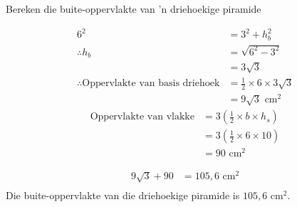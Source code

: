 \begin{wex}{Bereken die buite-oppervlakte van 'n driehoekige piramide}
{\begin{align*}

6^2 &= 3^2+h_b^2\\
\therefore h_b&=\sqrt{6^2-3^2}\\
&=3\sqrt{3}\\
\therefore \mbox{Oppervlakte van basis driehoek} &= \frac{1}{2} \times 6 \times 3\sqrt{3}\\
&=9\sqrt{3}\mbox{ cm}^2
\end{align*}
\begin{align*}
 \mbox{Oppervlakte van vlakke} &= 3\left(\frac{1}{2} \times b\times h_s\right)\\
&=3\left(\frac{1}{2} \times 6 \times 10\right)\\
&=90\mbox{ cm}^2
\end{align*}

\begin{align*}
9\sqrt{3} + 90&=105,6\mbox{ cm}^2\\

\end{align*}
Die buite-oppervlakte van die driehoekige piramide is $105,6$ cm$^{2}$.
}
\end{wex}
\clearpage
